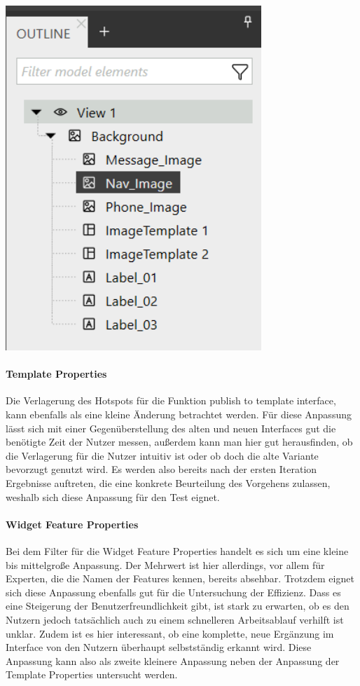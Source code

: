 \begin{center}
  \includegraphics[scale=0.8]{figures/Outline.png}
  \label{fig:Outline}
\end{center}

\paragraph{Template Properties}
Die Verlagerung des Hotspots für die Funktion \glqq publish to template interface\grqq{}, kann ebenfalls als eine kleine Änderung betrachtet werden.
Für diese Anpassung lässt sich mit einer Gegenüberstellung des alten und neuen Interfaces gut die benötigte Zeit der Nutzer messen, außerdem kann man hier gut herausfinden, ob die Verlagerung für die Nutzer intuitiv ist oder ob doch die alte Variante bevorzugt genutzt wird.
Es werden also bereits nach der ersten Iteration Ergebnisse auftreten, die eine konkrete Beurteilung des Vorgehens zulassen, weshalb sich diese Anpassung für den Test eignet.

\paragraph{Widget Feature Properties}
Bei dem Filter für die Widget Feature Properties handelt es sich um eine kleine bis mittelgroße Anpassung.
Der Mehrwert ist hier allerdings, vor allem für Experten, die die Namen der Features kennen, bereits absehbar.
Trotzdem eignet sich diese Anpassung ebenfalls gut für die Untersuchung der Effizienz.
Dass es eine Steigerung der Benutzerfreundlichkeit gibt, ist stark zu erwarten, ob es den Nutzern jedoch tatsächlich auch zu einem schnelleren Arbeitsablauf verhilft ist unklar.
Zudem ist es hier interessant, ob eine komplette, neue Ergänzung im Interface von den Nutzern überhaupt selbstständig erkannt wird.
Diese Anpassung kann also als zweite kleinere Anpassung neben der Anpassung der Template Properties untersucht werden.

